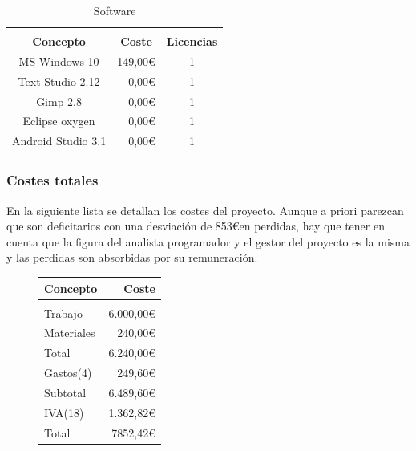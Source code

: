 \begin{table}[H]
	\centering
	\caption{Software}
	\label{Software}
	\renewcommand{\arraystretch}{2}
	
	\begin{tabular}{ccc}
		\multicolumn{3}{c}{\cellcolor{tittletable}{\color{white} \textbf{Software}}} \\
		\rowcolor{HeaderCol} 
		{\color{white} \textbf{Concepto}} & {\color{white} \textbf{Coste}} & {\color{white} \textbf{Licencias}}\\ 
		\hline
		
		\multicolumn{1}{|p{6cm}|}{MS Windows 10} & \multicolumn{1}{r|}{149,00\euro} 
		& \multicolumn{1}{c|}{1}\\ \hline
		
		\multicolumn{1}{|p{6cm}|}{Text Studio 2.12} & \multicolumn{1}{r|}{0,00\euro} 
		& \multicolumn{1}{c|}{1}\\ \hline
		
		\multicolumn{1}{|p{6cm}|}{Gimp 2.8} & \multicolumn{1}{r|}{0,00\euro} 
		& \multicolumn{1}{c|}{1}\\ \hline
		
		\multicolumn{1}{|p{6cm}|}{Eclipse oxygen} & \multicolumn{1}{r|}{0,00\euro} 
		& \multicolumn{1}{c|}{1}\\ \hline
		
		\multicolumn{1}{|p{6cm}|}{Android Studio 3.1} & \multicolumn{1}{r|}{0,00\euro} 
		& \multicolumn{1}{c|}{1}\\ \hline
		
	\end{tabular}
	
\end{table}

\subsubsection{Costes totales}
En la siguiente lista se detallan los costes del proyecto. Aunque a priori parezcan que son deficitarios con una desviación de 853\euro en perdidas, hay que tener en cuenta que la figura del analista programador y el gestor del proyecto es la misma y las perdidas son absorbidas por su remuneración.  

\begin{figure}[H]
	\centering
	\begin{tabular}{lr}
		\textbf{Concepto} & \textbf{Coste} \\ \hline \\
		Trabajo & 6.000,00\euro \\
		Materiales	& 240,00\euro \\
		Total & 6.240,00\euro \\
		Gastos(4) & 249,60\euro \\
		Subtotal & 6.489,60\euro \\
		IVA(18)	& 1.362,82\euro \\
		Total & 7852,42\euro \\ \hline
		
	\end{tabular} 
\end{figure}


